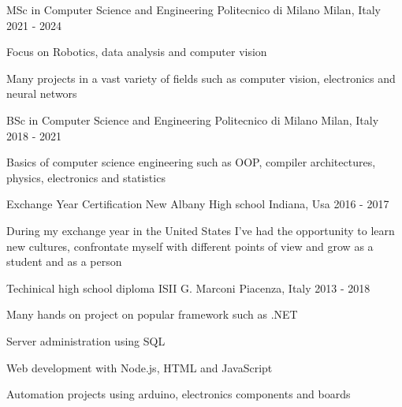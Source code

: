 

\begin{cventries}

  \cventry
    {MSc in Computer Science and Engineering} %
    {Politecnico di Milano} %
    {Milan, Italy} %
    {2021 - 2024} %
    {
      \begin{cvitems} %
        \item {Focus on Robotics, data analysis and computer vision}
        \item {Many projects in a vast variety of fields such as computer vision, electronics and neural networs}
      \end{cvitems}
    }
    
  \cventry
    {BSc in Computer Science and Engineering} %
    {Politecnico di Milano} %
    {Milan, Italy} %
    {2018 - 2021} %
    {
      \begin{cvitems} %
        \item {Basics of computer science engineering such as OOP, compiler architectures, physics, electronics and statistics}
      \end{cvitems}
    }
   \cventry
    {Exchange Year Certification} %
    {New Albany High school} %
    {Indiana, Usa} %
    {2016 - 2017} %
    {
      \begin{cvitems} %
        \item {During my exchange year in the United States I've had the opportunity to learn new cultures, confrontate myself with different points of view and grow as a student and as a person}
      \end{cvitems}
    }
  \cventry
    {Techinical high school diploma} %
    {ISII G. Marconi} %
    {Piacenza, Italy} %
    {2013 - 2018} %
    {
      \begin{cvitems} %
        \item {Many hands on project on popular framework such as .NET}
        \item {Server administration using SQL}
        \item {Web development with Node.js, HTML and JavaScript}
        \item {Automation projects using arduino, electronics components and boards}
      \end{cvitems}
    }

\end{cventries}
